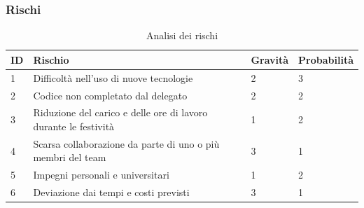\documentclass{article}
\begin{document}
        \subsubsection{Rischi}
        \begin{table}[h]
            \centering
            \begin{tabular}{|p{0.5cm}|p{7cm}|p{2cm}|p{2cm}|}
                \hline
                \textbf{ID} & \textbf{Rischio} & \textbf{Gravità} & \textbf{Probabilità} \\
                \hline
                1 & Difficoltà nell'uso di nuove tecnologie & 2 & 3 \\
                \hline
                2 & Codice non completato dal delegato & 2 & 2 \\
                \hline
                3 & Riduzione del carico e delle ore di lavoro durante le festività & 1 & 2 \\
                \hline
                4 & Scarsa collaborazione da parte di uno o più membri del team & 3 & 1 \\
                \hline
                5 & Impegni personali e universitari & 1 & 2 \\
                \hline
                6 & Deviazione dai tempi e costi previsti & 3 & 1 \\
                \hline
            \end{tabular}
            \caption{Analisi dei rischi}
            \label{tab:analisi_rischi}
        \end{table}
\end{document}
